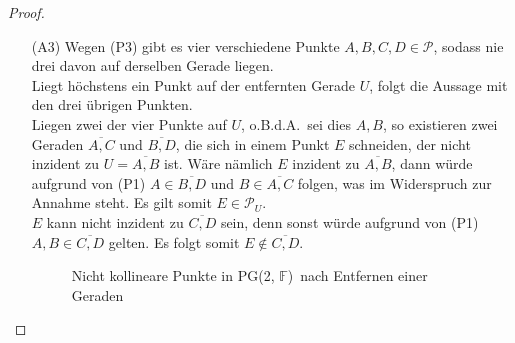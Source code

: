 \documentclass[hidelinks]{article}
\theoremstyle{plain}
\theoremstyle{definition}
\theoremstyle{rem}
\newcommand{\pgtwo}{PG(2, $\mathbb{F}$)\ }
\newcommand{\pu}{\mathcal{P}_U}
\begin{document}
\begin{sloppypar}
\begin{proof}
\begin{enumerate}
\begin{figure}[H]
 \caption{Parallelen in \pgtwo nach Entfernen einer Geraden}
\end{figure}
	\item[(A3)] Wegen (P3) gibt es vier verschiedene Punkte $A,B,C,D\in\mathcal{P}$, sodass nie drei davon auf derselben Gerade liegen.\\
		Liegt höchstens ein Punkt auf der entfernten Gerade $U$, folgt die Aussage mit den drei übrigen Punkten.\\
		Liegen zwei der vier Punkte auf $U$, o.B.d.A.\ sei dies $A,B$, so existieren zwei Geraden $\overline{A,C}$ und $\overline{B,D}$, die sich in einem Punkt $E$ schneiden, der nicht inzident zu $U=\overline{A,B}$ ist.
		Wäre nämlich $E$ inzident zu $\overline{A,B}$, dann würde aufgrund von (P1) $A\in\overline{B,D}$ und $B\in\overline{A,C}$ folgen, was im Widerspruch zur Annahme steht. Es gilt somit $E\in\pu$.\\
$E$ kann nicht inzident zu $\overline{C,D}$ sein, denn sonst würde aufgrund von (P1) $A,B\in\overline{C,D}$ gelten. Es folgt somit $E\notin\overline{C,D}$.
\begin{figure}[H]
\centering
 \caption{Nicht kollineare Punkte in \pgtwo nach Entfernen einer Geraden}
\end{figure}
\end{enumerate}
\vspace{-2em}
\end{proof}

\end{sloppypar}
\end{document}
